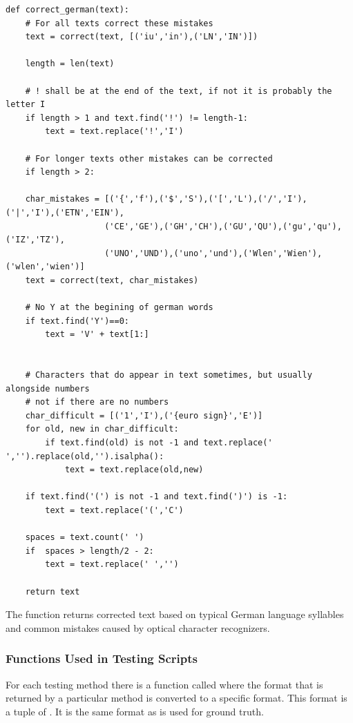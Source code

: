 \begin{lstlisting}[caption=correct\_german,label={lst:correctgerman}]    
def correct_german(text):    
    # For all texts correct these mistakes
    text = correct(text, [('iu','in'),('LN','IN')])

    length = len(text)

    # ! shall be at the end of the text, if not it is probably the letter I
    if length > 1 and text.find('!') != length-1:
        text = text.replace('!','I')

    # For longer texts other mistakes can be corrected
    if length > 2:

    char_mistakes = [('{','f'),('$','S'),('[','L'),('/','I'),('|','I'),('ETN','EIN'),
                    ('CE','GE'),('GH','CH'),('GU','QU'),('gu','qu'),('IZ','TZ'),
                    ('UNO','UND'),('uno','und'),('Wlen','Wien'),('wlen','wien')]
    text = correct(text, char_mistakes)

    # No Y at the begining of german words
    if text.find('Y')==0:
        text = 'V' + text[1:]


    # Characters that do appear in text sometimes, but usually alongside numbers
    # not if there are no numbers 
    char_difficult = [('1','I'),('{euro sign}','E')]
    for old, new in char_difficult:
        if text.find(old) is not -1 and text.replace(' ','').replace(old,'').isalpha():
            text = text.replace(old,new)

    if text.find('(') is not -1 and text.find(')') is -1:
        text = text.replace('(','C')

    spaces = text.count(' ')
    if  spaces > length/2 - 2:
        text = text.replace(' ','')
            
    return text
\end{lstlisting}   

The function returns corrected text based on typical German language syllables  and common mistakes caused by optical character recognizers.

\subsubsection*{Functions Used in Testing Scripts}

For each testing method there is a function called  where the format that is returned by a particular method is converted to a specific format. This format is a tuple of . It is the same format as is used for ground truth.

